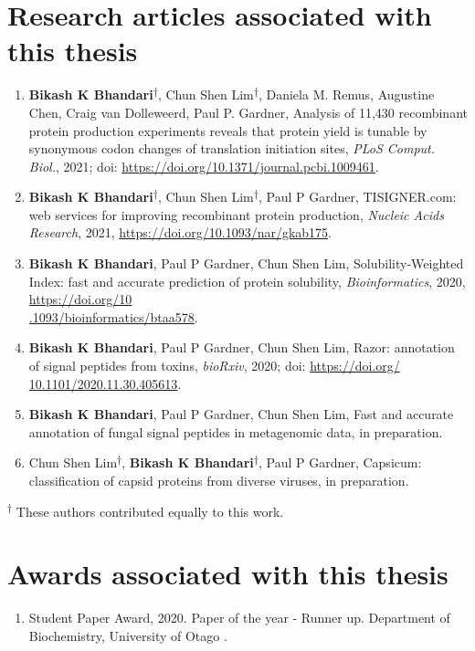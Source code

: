 \section*{Research articles associated with this thesis}
\begin{enumerate}

	\item \textbf{Bikash K Bhandari}\textsuperscript{$\dagger$}, Chun Shen Lim\textsuperscript{$\dagger$}, Daniela M. Remus, Augustine Chen, Craig van Dolleweerd, Paul P. Gardner, Analysis of 11,430 recombinant protein production experiments reveals that protein yield is tunable by synonymous codon changes of translation initiation sites, \textit{PLoS Comput. Biol.}, 2021; doi: \href{https://doi.org/10.1371/journal.pcbi.1009461}{https://doi.org/10.1371/journal.pcbi.1009461}.

	\item \textbf{Bikash K Bhandari}\textsuperscript{$\dagger$}, Chun Shen Lim\textsuperscript{$\dagger$}, Paul P Gardner, TISIGNER.com: web services for improving recombinant protein production, \textit{Nucleic Acids Research}, 2021, \href{https://doi.org/10.1093/nar/gkab175}{https://doi.org/10.1093/nar/gkab175}.

	\item \textbf{Bikash K Bhandari}, Paul P Gardner, Chun Shen Lim, Solubility-Weighted Index: fast and accurate prediction of protein solubility, \textit{Bioinformatics}, 2020, \href{https://doi.org/10.1093/bioinformatics/btaa578}{https://doi.org/10\\.1093/bioinformatics/btaa578}.

	\item \textbf{Bikash K Bhandari}, Paul P Gardner, Chun Shen Lim, Razor: annotation of signal peptides from toxins, \textit{bioRxiv}, 2020; doi: \href{https://doi.org/10.1101/2020.11.30.405613}{https://doi.org/\\10.1101/2020.11.30.405613}.

	\item \textbf{Bikash K Bhandari}, Paul P Gardner, Chun Shen Lim, Fast and accurate annotation of fungal signal peptides in metagenomic data, in preparation.


	\item Chun Shen Lim\textsuperscript{$\dagger$}, \textbf{Bikash K Bhandari}\textsuperscript{$\dagger$}, Paul P Gardner, Capsicum: classification of capsid proteins from diverse viruses, in preparation.


\end{enumerate}

\textsuperscript{$\dagger$} These authors contributed equally to this work.



\section*{Awards associated with this thesis}
\begin{enumerate}
	\item Student Paper Award, 2020. Paper of the year - Runner up. Department of Biochemistry, University of Otago \cite{Bhandari2020-pz}.

\end{enumerate}
